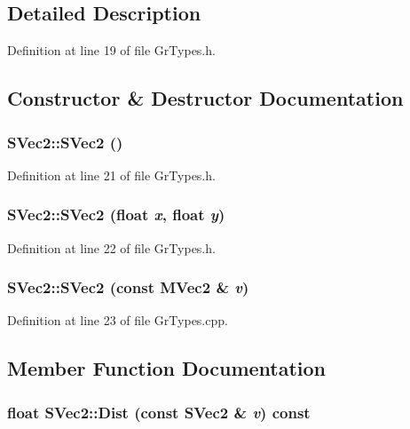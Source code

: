 \subsection{Detailed Description}


Definition at line 19 of file GrTypes.h.

\subsection{Constructor \& Destructor Documentation}
\hypertarget{struct_s_vec2_684d52bddcb852a9c3af59441d3a9f5a}{
\subsubsection[{SVec2}]{\setlength{\rightskip}{0pt plus 5cm}SVec2::SVec2 ()}}
\label{struct_s_vec2_684d52bddcb852a9c3af59441d3a9f5a}




Definition at line 21 of file GrTypes.h.\hypertarget{struct_s_vec2_8e24b6d71d48cd646848f64d0e667c60}{
\subsubsection[{SVec2}]{\setlength{\rightskip}{0pt plus 5cm}SVec2::SVec2 (float {\em x}, \/  float {\em y})}}
\label{struct_s_vec2_8e24b6d71d48cd646848f64d0e667c60}




Definition at line 22 of file GrTypes.h.\hypertarget{struct_s_vec2_abeefa09246898126cdfa47fc7110e49}{
\subsubsection[{SVec2}]{\setlength{\rightskip}{0pt plus 5cm}SVec2::SVec2 (const {\bf MVec2} \& {\em v})}}
\label{struct_s_vec2_abeefa09246898126cdfa47fc7110e49}




Definition at line 23 of file GrTypes.cpp.

\subsection{Member Function Documentation}
\hypertarget{struct_s_vec2_a6b9f4be7a7a39d41dab8d71f17e226b}{
\subsubsection[{Dist}]{\setlength{\rightskip}{0pt plus 5cm}float SVec2::Dist (const {\bf SVec2} \& {\em v}) const}}
\label{struct_s_vec2_a6b9f4be7a7a39d41dab8d71f17e226b}




